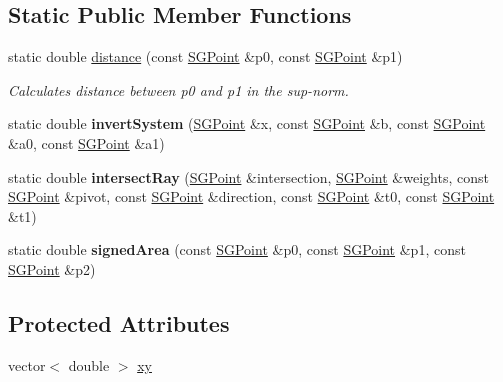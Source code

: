 \subsection*{Static Public Member Functions}
\begin{DoxyCompactItemize}
\item 
\hypertarget{classSGPoint_a48385eb046cb530f7a7af6a147b6218c}{static double \hyperlink{classSGPoint_a48385eb046cb530f7a7af6a147b6218c}{distance} (const \hyperlink{classSGPoint}{S\-G\-Point} \&p0, const \hyperlink{classSGPoint}{S\-G\-Point} \&p1)}\label{classSGPoint_a48385eb046cb530f7a7af6a147b6218c}

\begin{DoxyCompactList}\small\item\em Calculates distance between p0 and p1 in the sup-\/norm. \end{DoxyCompactList}\item 
\hypertarget{classSGPoint_a0a613c9498f11a7d2d50c4f7f371dab9}{static double {\bfseries invert\-System} (\hyperlink{classSGPoint}{S\-G\-Point} \&x, const \hyperlink{classSGPoint}{S\-G\-Point} \&b, const \hyperlink{classSGPoint}{S\-G\-Point} \&a0, const \hyperlink{classSGPoint}{S\-G\-Point} \&a1)}\label{classSGPoint_a0a613c9498f11a7d2d50c4f7f371dab9}

\item 
\hypertarget{classSGPoint_a81992734a4de046226d60b3df576bbb6}{static double {\bfseries intersect\-Ray} (\hyperlink{classSGPoint}{S\-G\-Point} \&intersection, \hyperlink{classSGPoint}{S\-G\-Point} \&weights, const \hyperlink{classSGPoint}{S\-G\-Point} \&pivot, const \hyperlink{classSGPoint}{S\-G\-Point} \&direction, const \hyperlink{classSGPoint}{S\-G\-Point} \&t0, const \hyperlink{classSGPoint}{S\-G\-Point} \&t1)}\label{classSGPoint_a81992734a4de046226d60b3df576bbb6}

\item 
\hypertarget{classSGPoint_a24a3cc80a532ee6b5c85713b69153311}{static double {\bfseries signed\-Area} (const \hyperlink{classSGPoint}{S\-G\-Point} \&p0, const \hyperlink{classSGPoint}{S\-G\-Point} \&p1, const \hyperlink{classSGPoint}{S\-G\-Point} \&p2)}\label{classSGPoint_a24a3cc80a532ee6b5c85713b69153311}

\end{DoxyCompactItemize}
\subsection*{Protected Attributes}
\begin{DoxyCompactItemize}
\item 
vector$<$ double $>$ \hyperlink{classSGPoint_a3ad7a78283a2797a567575a2a5c3200e}{xy}
\end{DoxyCompactItemize}
